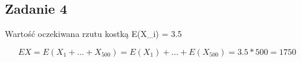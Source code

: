 \subsection{Zadanie 4}
Wartość oczekiwana rzutu kostką E(X_i) = 3.5

$$
EX = E(X_1 + ... + X_{500}) = E(X_1) + ... + E(X_{500}) = 3.5 * 500 = 1750
$$

